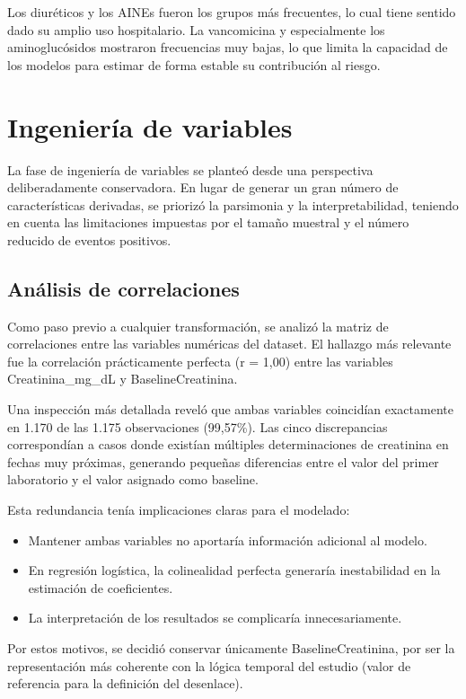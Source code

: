 \documentclass[12pt, a4paper, oneside]{report}
\begin{document}
Los diuréticos y los AINEs fueron los grupos más frecuentes, lo cual tiene sentido dado su amplio uso hospitalario. La vancomicina y especialmente los aminoglucósidos mostraron frecuencias muy bajas, lo que limita la capacidad de los modelos para estimar de forma estable su contribución al riesgo.

\section{Ingeniería de variables}

La fase de ingeniería de variables se planteó desde una perspectiva deliberadamente conservadora. En lugar de generar un gran número de características derivadas, se priorizó la parsimonia y la interpretabilidad, teniendo en cuenta las limitaciones impuestas por el tamaño muestral y el número reducido de eventos positivos.

\subsection{Análisis de correlaciones}

Como paso previo a cualquier transformación, se analizó la matriz de correlaciones entre las variables numéricas del dataset. El hallazgo más relevante fue la correlación prácticamente perfecta (r = 1,00) entre las variables Creatinina\_mg\_dL y BaselineCreatinina.

Una inspección más detallada reveló que ambas variables coincidían exactamente en 1.170 de las 1.175 observaciones (99,57\%). Las cinco discrepancias correspondían a casos donde existían múltiples determinaciones de creatinina en fechas muy próximas, generando pequeñas diferencias entre el valor del primer laboratorio y el valor asignado como baseline.

Esta redundancia tenía implicaciones claras para el modelado:

\begin{itemize}
    \item Mantener ambas variables no aportaría información adicional al modelo.
    \item En regresión logística, la colinealidad perfecta generaría inestabilidad en la estimación de coeficientes.
    \item La interpretación de los resultados se complicaría innecesariamente.
\end{itemize}

Por estos motivos, se decidió conservar únicamente BaselineCreatinina, por ser la representación más coherente con la lógica temporal del estudio (valor de referencia para la definición del desenlace).
\end{document}
